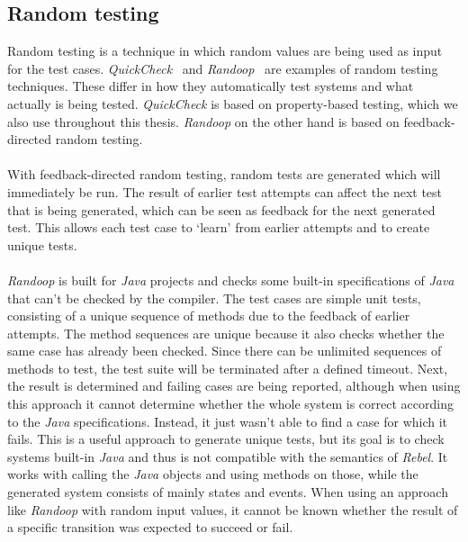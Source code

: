 \subsection{Random testing}
Random testing is a technique in which random values are being used as input
for the test cases. \textit{QuickCheck}~\cite{claessen2011quickcheck} and
\textit{Randoop}~\cite{pacheco2007randoop} are examples of random testing
techniques. These differ in how they automatically test systems and what
actually is being tested. \textit{QuickCheck} is based on property-based
testing, which we also use throughout this thesis. \textit{Randoop} on the other
hand is based on feedback-directed random testing.\\
\\
With feedback-directed random testing, random tests are generated which will
immediately be run. The result of earlier test attempts can affect the next test
that is being generated, which can be seen as feedback for the next generated
test. This allows each test case to `learn' from earlier attempts and to create
unique tests.\\
\\
\textit{Randoop} is built for \textit{Java} projects and checks some built-in
specifications of \textit{Java} that can't be checked by the compiler. The test
cases are simple unit tests, consisting of a unique sequence of methods due to
the feedback of earlier attempts. The method sequences are unique because it
also checks whether the same case has already been checked. Since there can be
unlimited sequences of methods to test, the test suite will be terminated after
a defined timeout. Next, the result is determined and failing cases are being
reported, although when using this approach it cannot determine whether the
whole system is correct according to the \textit{Java} specifications. Instead,
it just wasn't able to find a case for which it fails. This is a useful approach
to generate unique tests, but its goal is to check systems built-in
\textit{Java} and thus is not compatible with the semantics of \textit{Rebel}.
It works with calling the \textit{Java} objects and using methods on those,
while the generated system consists of mainly states and events. When using an
approach like \textit{Randoop} with random input values, it cannot be known
whether the result of a specific transition was expected to succeed or fail.\\
